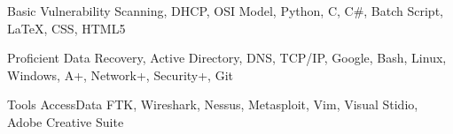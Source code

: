

\begin{cvhonors}

  \cvhonor
    {Basic} %
    {Vulnerability Scanning, DHCP, OSI Model, Python, C, C\#, Batch Script, \LaTeX, CSS, HTML5} %

  \cvhonor
    {Proficient} %
    {Data Recovery, Active Directory, DNS, TCP/IP, Google, Bash, Linux, Windows, A+, Network+, Security+, Git} %

  \cvhonor
    {Tools} %
    {AccessData FTK, Wireshark, Nessus, Metasploit, Vim, Visual Stidio, Adobe Creative Suite} %


\end{cvhonors}